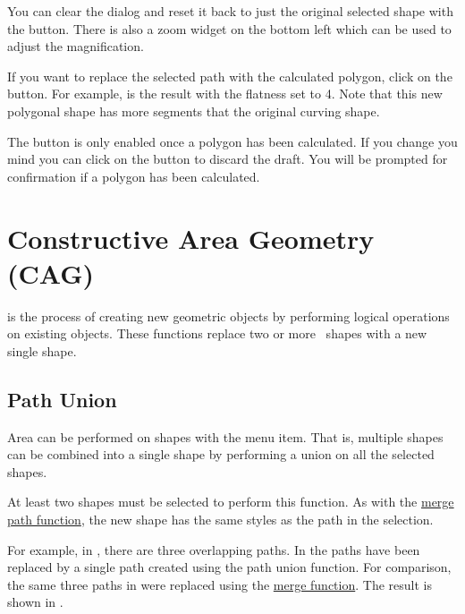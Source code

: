 You can clear the dialog and reset it back to just the original
selected shape with the  button.
There is also a zoom widget on the bottom left which can be used to
adjust the magnification.

If you want to replace the selected path with the
calculated polygon, click on the  button.  For example,
 is the result with the flatness set
to 4. Note that this new polygonal shape has more segments that the 
original curving shape.

\begin{information}
The  button is only enabled once a polygon has been
calculated. If you change you mind you can click on the 
button to discard the draft. You will be prompted for confirmation
if a polygon has been calculated.
\end{information}


\section{Constructive Area Geometry (CAG)}\label{sec:cag}

 is the process of creating new geometric objects by
performing logical operations on existing objects. These functions
replace two or more \selected\ \glspl*{shape} with a new single
\gls{shape}.

\subsection{Path Union}\label{sec:pathunion}


Area  can be performed on
\glspl{shape} with the  menu item. That is,
multiple \glspl{shape} can be combined into a single \gls*{shape} by
performing a union on all the selected \glspl*{shape}.

At least two \glspl*{shape} must be selected to perform this
function. As with the \hyperref[sec:mergepaths]{merge path function}, the
new shape has the same styles as the  path
in the selection.

For example, in , there are three
overlapping paths.  In  the paths have
been replaced by a single path created using the path union
function. For comparison, the same three paths in
 were replaced using the
\hyperref[sec:mergepaths]{merge function}. The result is shown in
.

